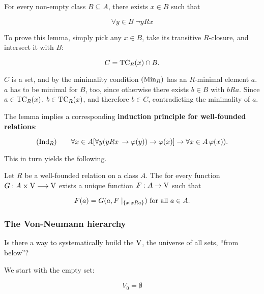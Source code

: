 \begin{lemma}\label{lem-min-wf}For every non-empty class $B \subseteq A$, there exists $x \in B$ such that

\begin{equation}
\forall y \in B \;  \neg y R x
\end{equation}

\end{lemma}To prove this lemma, simply pick any $x \in B$, take its transitive $R$-closure, and intersect it with $B$:

\begin{equation}
C = \operatorname{TC}_R(x) \cap B.
\end{equation}

$C$ is a set, and by the minimality condition $(\operatorname{Min}_R)$ has an $R$-minimal element $a$. $a$ has to be minimal for $B$, too, since otherwise there exists $b \in B$ with $b R a$. Since $a \in \operatorname{TC}_R(x)$, $b \in \operatorname{TC}_R(x)$, and therefore $b \in C$, contradicting the minimality of $a$.

The lemma implies a corresponding \textbf{induction principle for well-founded relations}:

\begin{equation*}
(\operatorname{Ind}_R) \qquad  \forall x \in A [ \forall y ( yRx \, \to \varphi(y)) \to \varphi(x)] \to \forall x \in A \, \varphi(x)).
\end{equation*}

This in turn yields the following.

\begin{theorem}\label{thm-wf-recursion}Let $R$ be a well-founded relation on a class $A$. The for every function $G : A \times \operatorname{V} \longrightarrow  \operatorname{V}$ exists a unique function $F: A \to \operatorname{V}$ such that

\begin{equation*}
F(a) = G(a,F \mid_{\{x \mid xRa\}})  \text{ for all } a \in A.
\end{equation*}
\end{theorem}\subsubsection{The Von-Neumann hierarchy}

Is there a way to systematically build the $\operatorname{V}$, the universe of all sets, ``from below''?

We start with the empty set:

\begin{equation}
V_0 = \emptyset
\end{equation}

